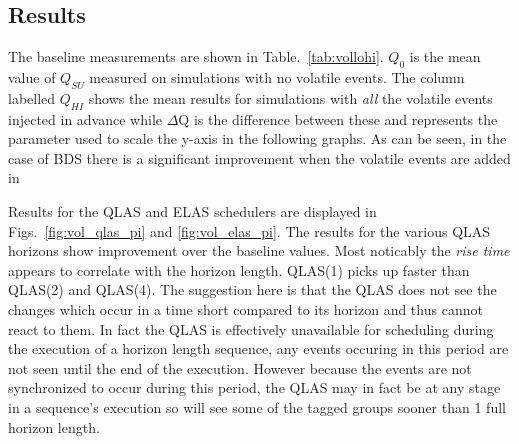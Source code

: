 \subsection{Results}

The baseline measurements are shown in Table.~\ref{tab:vollohi}. $Q_0$ is the mean value of $Q_{SU}$ measured on simulations with no volatile events. The column labelled $Q_{HI}$ shows the mean results for simulations with \emph{all} the volatile events injected in advance while $\Delta$Q is the difference between these and represents the parameter used to scale the y-axis in the following graphs. As can be seen, in the case of BDS there is a significant improvement when the volatile events are added in 

Results for the QLAS and ELAS schedulers are displayed in Figs.~\ref{fig:vol_qlas_pi} and \ref{fig:vol_elas_pi}. The results for the various QLAS horizons show improvement over the baseline values. Most noticably the \emph{rise time} appears to correlate with the horizon length.  QLAS(1) picks up faster than QLAS(2) and QLAS(4). The suggestion here is that the QLAS does not see the changes which occur in a time short compared to its horizon and thus cannot react to them. In fact the QLAS is effectively unavailable for scheduling during the execution of a horizon length sequence, any events occuring in this period are not seen until the end of the execution. However because the events are not synchronized to occur during this period, the QLAS may in fact be at any stage in a sequence's execution so will see some of the tagged groups sooner than 1 full horizon length.

